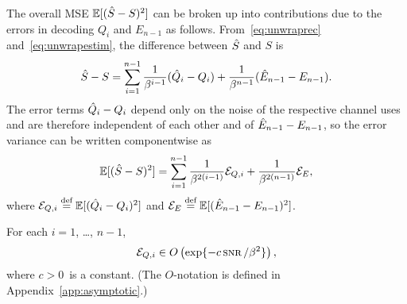 The overall MSE ${\mathbb{E}[({\hat{S}} - S)^2]}$ can be broken up into contributions due to the
errors in decoding $Q_i$ and $E_{n-1}$ as follows. From~\eqref{eq:unwraprec}
and~\eqref{eq:unwrapestim}, the difference between ${\hat{S}}$ and $S$ is
\begin{equation*}
  {\hat{S}} - S = \sum_{i=1}^{n-1} \frac1{\beta^{i-1}} (\hat{Q}_i - Q_i) + \frac1{\beta^{n-1}}
  (\hat{E}_{n-1} - E_{n-1}).
\end{equation*}
The error terms $\hat{Q}_i - Q_i$ depend only on the noise of the respective channel
uses and are therefore independent of each other and of $\hat{E}_{n-1} - E_{n-1}$,
so the error variance can be written componentwise as
\begin{equation}
  \label{eq:totalerror}
  {\mathbb{E}[({\hat{S}}- S)^2]} = \sum_{i=1}^{n-1} \frac{1}{\beta^{2(i-1)}} {{\mathcal{E}}_{Q,i}} +
  \frac{1}{\beta^{2(n-1)}} {{\mathcal{E}}_E}, 
\end{equation}
where ${{\mathcal{E}}_{Q,i}} \stackrel{\text{def}}{=} \mathbb{E}[(\hat{Q}_i - Q_i)^2]$ and ${{\mathcal{E}}_E} \stackrel{\text{def}}{=} \mathbb{E}[(\hat{E}_{n-1} -
E_{n-1})^2]$.

\begin{lemma}
  \label{lem:eqbound}
  For each $i = 1$, \dots, $n-1$, 
  \begin{equation}
    \label{eq:eqidecay}
    \Eqi \in O\left(\exp\{-c \snr/\beta^2\}\right),
  \end{equation}
  where $c > 0$~is a constant.
(The $O$-notation is defined in Appendix~\ref{app:asymptotic}.)
\end{lemma}

